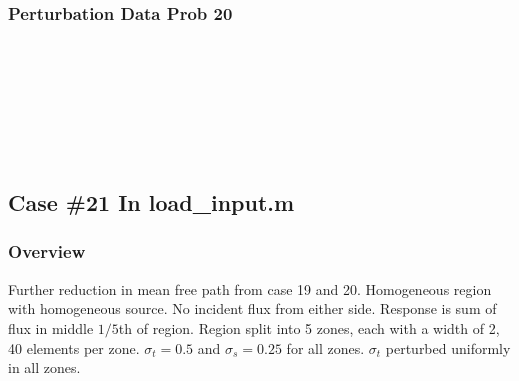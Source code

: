 \documentclass{article}
\begin{document}
\subsubsection{Perturbation Data Prob 20}
\\ \\
\\ \\
\\ \\

\subsection{Case \#21 In load\_input.m}
\subsubsection{Overview}
Further reduction in mean free path from case 19 and 20. Homogeneous region with homogeneous source. No incident flux from either side. Response is sum of flux in middle $1/5$th of region. Region split into 5 zones, each with a width of 2, 40 elements per zone. $\sigma_t = 0.5$ and $\sigma_s=0.25$ for all zones. $\sigma_t$ perturbed uniformly in all zones.
\end{document}
